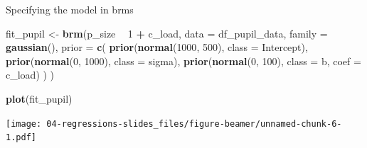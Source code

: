 \documentclass[12pt,ignorenonframetext,aspectratio=169]{beamer}
\newenvironment{Shaded}{\begin{snugshade}}{\end{snugshade}}
\newcommand{\DataTypeTok}[1]{\textcolor[rgb]{0.13,0.29,0.53}{#1}}
\newcommand{\DecValTok}[1]{\textcolor[rgb]{0.00,0.00,0.81}{#1}}
\newcommand{\KeywordTok}[1]{\textcolor[rgb]{0.13,0.29,0.53}{\textbf{#1}}}
\newcommand{\NormalTok}[1]{#1}
\newcommand{\OperatorTok}[1]{\textcolor[rgb]{0.81,0.36,0.00}{\textbf{#1}}}
\newcommand{\StringTok}[1]{\textcolor[rgb]{0.31,0.60,0.02}{#1}}
\begin{document}
\begin{frame}[fragile]{Specifying the model in brms}
\protect\hypertarget{specifying-the-model-in-brms}{}

\scriptsize

\begin{Shaded}
\begin{Highlighting}[]
\NormalTok{fit_pupil <-}\StringTok{ }\KeywordTok{brm}\NormalTok{(p_size }\OperatorTok{~}\StringTok{ }\DecValTok{1} \OperatorTok{+}\StringTok{ }\NormalTok{c_load,}
  \DataTypeTok{data =}\NormalTok{ df_pupil_data,}
  \DataTypeTok{family =} \KeywordTok{gaussian}\NormalTok{(),}
  \DataTypeTok{prior =} \KeywordTok{c}\NormalTok{(}
    \KeywordTok{prior}\NormalTok{(}\KeywordTok{normal}\NormalTok{(}\DecValTok{1000}\NormalTok{, }\DecValTok{500}\NormalTok{), }\DataTypeTok{class =}\NormalTok{ Intercept),}
    \KeywordTok{prior}\NormalTok{(}\KeywordTok{normal}\NormalTok{(}\DecValTok{0}\NormalTok{, }\DecValTok{1000}\NormalTok{), }\DataTypeTok{class =}\NormalTok{ sigma),}
    \KeywordTok{prior}\NormalTok{(}\KeywordTok{normal}\NormalTok{(}\DecValTok{0}\NormalTok{, }\DecValTok{100}\NormalTok{), }\DataTypeTok{class =}\NormalTok{ b, }\DataTypeTok{coef =}\NormalTok{ c_load)}
\NormalTok{  )}
\NormalTok{)}
\end{Highlighting}
\end{Shaded}

\normalsize

\end{frame}

\begin{frame}[fragile]

\small

\begin{Shaded}
\begin{Highlighting}[]
\KeywordTok{plot}\NormalTok{(fit_pupil)}
\end{Highlighting}
\end{Shaded}

\texttt{[image: 04-regressions-slides\_files/figure-beamer/unnamed-chunk-6-1.pdf]}

\normalsize

\end{frame}
\end{document}
